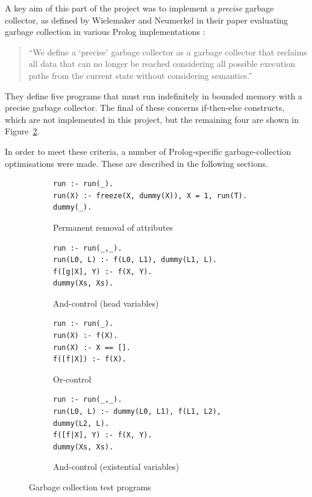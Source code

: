 A key aim of this part of the project was to implement a \emph{precise} garbage collector, as defined by Wielemaker and Neumerkel in their paper evaluating garbage collection in various Prolog implementations \cite{wielemakerPreciseGarbageCollection2008}:

\begin{quote}
``We define a `precise' garbage collector as a garbage collector that reclaims all data that can no longer be reached considering all possible execution paths from the current state without considering semantics.''
\end{quote}

They define five programs that must run indefinitely in bounded memory with a precise garbage collector. The final of these concerns if-then-else constructs, which are not implemented in this project, but the remaining four are shown in Figure~\ref{fig:gc-programs}.

In order to meet these criteria, a number of Prolog-specific garbage-collection optimisations were made. These are described in the following sections.

\begin{figure}[H]
\centering
\begin{subfigure}{\textwidth}
\centering
\begin{verbatim}
run :- run(_).
run(X) :- freeze(X, dummy(X)), X = 1, run(T).
dummy(_).
\end{verbatim}
\caption{Permanent removal of attributes}
\end{subfigure}
\par\bigskip
\par\bigskip
\begin{subfigure}{.65\textwidth}
\centering
\begin{verbatim}
run :- run(_,_).
run(L0, L) :- f(L0, L1), dummy(L1, L).
f([g|X], Y) :- f(X, Y).
dummy(Xs, Xs).
\end{verbatim}
\caption{And-control (head variables)}
\end{subfigure}%
\begin{subfigure}{.35\textwidth}
\centering
\begin{verbatim}
run :- run(_).
run(X) :- f(X).
run(X) :- X == [].
f([f|X]) :- f(X).
\end{verbatim}
\caption{Or-control}
\label{fig:or-control}
\end{subfigure}
\par\bigskip
\par\bigskip
\begin{subfigure}{\textwidth}
\centering
\begin{verbatim}
run :- run(_,_).
run(L0, L) :- dummy(L0, L1), f(L1, L2), dummy(L2, L).
f([f|X], Y) :- f(X, Y).
dummy(Xs, Xs).
\end{verbatim}
\caption{And-control (existential variables)}
\end{subfigure}
\caption{Garbage collection test programs}
\label{fig:gc-programs}
\end{figure}

